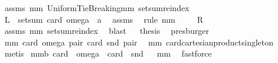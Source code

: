 \begin{isabellebody}
%
\isadelimproof
%
\endisadelimproof
%
\isatagproof
{}\isamarkupfalse%
\ assms\ mm{}{}\ UniformTieBreaking{\isachardot}mm{}{}\ setsum{\isachardot}reindex\ \isanewline
{}\isamarkupfalse%
\ {\isacharminus}\isanewline
{}\isamarkupfalse%
\ {\isachardoublequoteopen}{\isacharquery}L\ {\isacharequal}\ setsum\ card\ {\isacharparenleft}omega\ {\isacharbackquote}\ a{\isacharparenright}{\isachardoublequoteclose}\ \isamarkupfalse%
\ assms{\isacharparenleft}{}{\isacharcomma}{}{\isacharcomma}{}{\isacharparenright}\ \isamarkupfalse%
\ {\isacharparenleft}rule\ mm{}{}{\isacharparenright}\isanewline
{}\isamarkupfalse%
\ \isamarkupfalse%
\ {\isachardoublequoteopen}{\isachardot}{\isachardot}{\isachardot}\ {\isacharequal}\ {\isacharquery}R{\isachardoublequoteclose}\ \isamarkupfalse%
\ assms{\isacharparenleft}{}{\isacharparenright}\ mm{}{}\ setsum{\isachardot}reindex\ \isamarkupfalse%
\ blast\isanewline
{}\isamarkupfalse%
\ \isamarkupfalse%
\ {\isacharquery}thesis\ \isamarkupfalse%
\ presburger\isanewline
{}\isamarkupfalse%
%
\endisatagproof
{\isafoldproof}%
%
\isadelimproof
\isanewline
%
\endisadelimproof
\isanewline
{}\isamarkupfalse%
\ mm{}{}{\isacharcolon}\ {\isachardoublequoteopen}card\ {\isacharparenleft}omega\ pair{\isacharparenright}{\isacharequal}\ card\ {\isacharparenleft}snd\ pair{\isacharparenright}{\isachardoublequoteclose}\ \isanewline
%
\isadelimproof
%
\endisadelimproof
%
\isatagproof
{}\isamarkupfalse%
\ mm{}{}\ card{\isacharunderscore}cartesian{\isacharunderscore}product{\isacharunderscore}singleton\ \isamarkupfalse%
\ metis%
\endisatagproof
{\isafoldproof}%
%
\isadelimproof
\isanewline
%
\endisadelimproof
\isanewline
{}\isamarkupfalse%
\ mm{}{}b{\isacharcolon}\ {\isachardoublequoteopen}card\ {\isasymcirc}\ omega\ {\isacharequal}\ card\ {\isasymcirc}\ snd{\isachardoublequoteclose}%
\isadelimproof
\ %
\endisadelimproof
%
\isatagproof
{}\isamarkupfalse%
\ mm{}{}\ \isamarkupfalse%
\ fastforce%
\endisatagproof
{\isafoldproof}%
%
\isadelimproof
%
\endisadelimproof
\isanewline
\isanewline
{}\isamarkupfalse%

\end{isabellebody}
